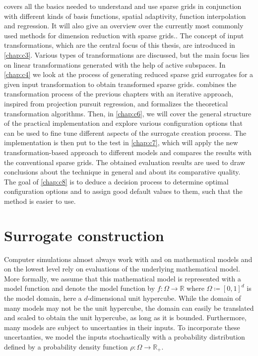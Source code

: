 \documentclass[
  a4paper,  %
  twoside,  %
  bibliography=totoc,
  headsepline,
  cleardoublepage=empty,
  parskip=half,
  draft=false
]{scrbook}
\begin{document}
 covers all the basics needed to understand and use sparse grids in conjunction with different kinds of basis functions, spatial adaptivity, function interpolation and regression.
It will also give an overview over the currently most commonly used methods for dimension reduction with sparse grids..
The concept of input transformations, which are the central focus of this thesis, are introduced in \cref{chap:c3}.
Various types of transformations are discussed, but the main focus lies on linear transformations generated with the help of active subspaces.
In \cref{chap:c4} we look at the process of generating reduced sparse grid surrogates for a given input transformation to obtain transformed sparse grids.
 combines the transformation process of the previous chapters with an iterative approach, inspired from projection pursuit regression, and formalizes the theoretical transformation algorithms.
Then, in \cref{chap:c6}, we will cover the general structure of the practical implementation and explore various configuration options that can be used to fine tune different aspects of the surrogate creation process.
The implementation is then put to the test in \cref{chap:c7}, which will apply the new transformation-based approach to different models and compares the results with the conventional sparse grids.
The obtained evaluation results are used to draw conclusions about the technique in general and about its comparative quality.
The goal of \cref{chap:c8} is to deduce a decision process to determine optimal configuration options and to assign good default values to them, such that the method is easier to use.


\chapter{Surrogate construction}
\label{chap:c2}

Computer simulations almost always work with and on mathematical models and on the lowest level rely on evaluations of the underlying mathematical model.
More formally, we assume that this mathematical model is represented with a model function and denote the model function by $f \colon \Omega \to \mathds{R}$ where $\Omega \coloneqq [0,1]^d$ is the model domain, here a $d$-dimensional unit hypercube.
While the domain of many models may not be the unit hypercube, the domain can easily be translated and scaled to obtain the unit hypercube, as long as it is bounded.
Furthermore, many models are subject to uncertanties in their inputs.
To incorporate these uncertanties, we model the inputs stochastically with a probability distribution defined by a probability density function $\rho \colon \Omega \to \mathds{R_+}$.
\end{document}
